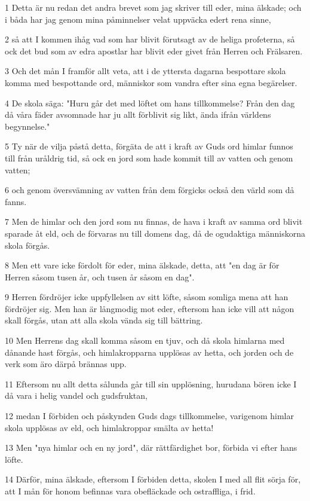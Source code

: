 \par 1 Detta är nu redan det andra brevet som jag skriver till eder, mina älskade; och i båda har jag genom mina påminnelser velat uppväcka edert rena sinne,
\par 2 så att I kommen ihåg vad som har blivit förutsagt av de heliga profeterna, så ock det bud som av edra apostlar har blivit eder givet från Herren och Frälsaren.
\par 3 Och det mån I framför allt veta, att i de yttersta dagarna bespottare skola komma med bespottande ord, människor som vandra efter sina egna begärelser.
\par 4 De skola säga: "Huru går det med löftet om hans tillkommelse? Från den dag då våra fäder avsomnade har ju allt förblivit sig likt, ända ifrån världens begynnelse."
\par 5 Ty när de vilja påstå detta, förgäta de att i kraft av Guds ord himlar funnos till från uråldrig tid, så ock en jord som hade kommit till av vatten och genom vatten;
\par 6 och genom översvämning av vatten från dem förgicks också den värld som då fanns.
\par 7 Men de himlar och den jord som nu finnas, de hava i kraft av samma ord blivit sparade åt eld, och de förvaras nu till domens dag, då de ogudaktiga människorna skola förgås.
\par 8 Men ett vare icke fördolt för eder, mina älskade, detta, att "en dag är för Herren såsom tusen år, och tusen år såsom en dag".
\par 9 Herren fördröjer icke uppfyllelsen av sitt löfte, såsom somliga mena att han fördröjer sig. Men han är långmodig mot eder, eftersom han icke vill att någon skall förgås, utan att alla skola vända sig till bättring.
\par 10 Men Herrens dag skall komma såsom en tjuv, och då skola himlarna med dånande hast förgås, och himlakropparna upplösas av hetta, och jorden och de verk som äro därpå brännas upp.
\par 11 Eftersom nu allt detta sålunda går till sin upplösning, hurudana bören icke I då vara i helig vandel och gudsfruktan,
\par 12 medan I förbiden och påskynden Guds dags tillkommelse, varigenom himlar skola upplösas av eld, och himlakroppar smälta av hetta!
\par 13 Men "nya himlar och en ny jord", där rättfärdighet bor, förbida vi efter hans löfte.
\par 14 Därför, mina älskade, eftersom I förbiden detta, skolen I med all flit sörja för, att I mån för honom befinnas vara obefläckade och ostraffliga, i frid.
